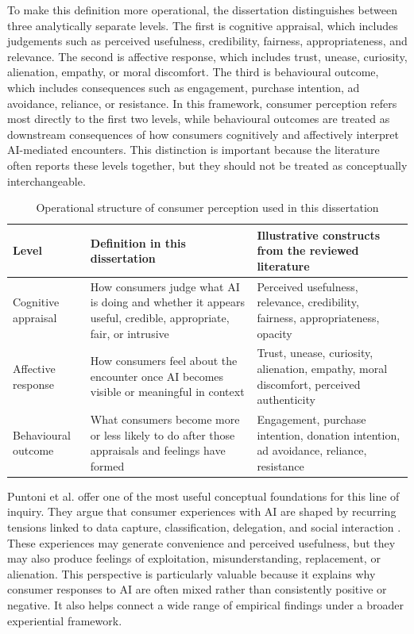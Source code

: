To make this definition more operational, the dissertation distinguishes between three analytically separate levels. The first is cognitive appraisal, which includes judgements such as perceived usefulness, credibility, fairness, appropriateness, and relevance. The second is affective response, which includes trust, unease, curiosity, alienation, empathy, or moral discomfort. The third is behavioural outcome, which includes consequences such as engagement, purchase intention, ad avoidance, reliance, or resistance. In this framework, consumer perception refers most directly to the first two levels, while behavioural outcomes are treated as downstream consequences of how consumers cognitively and affectively interpret AI-mediated encounters. This distinction is important because the literature often reports these levels together, but they should not be treated as conceptually interchangeable.

\begin{table}[ht]
\centering
\caption{Operational structure of consumer perception used in this dissertation}
\begin{tabular}{p{3.2cm} p{4.5cm} p{6.2cm}}
\toprule
Level & Definition in this dissertation & Illustrative constructs from the reviewed literature \\
\midrule
Cognitive appraisal & How consumers judge what AI is doing and whether it appears useful, credible, appropriate, fair, or intrusive & Perceived usefulness, relevance, credibility, fairness, appropriateness, opacity \\
Affective response & How consumers feel about the encounter once AI becomes visible or meaningful in context & Trust, unease, curiosity, alienation, empathy, moral discomfort, perceived authenticity \\
Behavioural outcome & What consumers become more or less likely to do after those appraisals and feelings have formed & Engagement, purchase intention, donation intention, ad avoidance, reliance, resistance \\
\bottomrule
\end{tabular}
\end{table}

Puntoni et al. offer one of the most useful conceptual foundations for this line of inquiry. They argue that consumer experiences with AI are shaped by recurring tensions linked to data capture, classification, delegation, and social interaction \cite{puntoni2021experiential}. These experiences may generate convenience and perceived usefulness, but they may also produce feelings of exploitation, misunderstanding, replacement, or alienation. This perspective is particularly valuable because it explains why consumer responses to AI are often mixed rather than consistently positive or negative. It also helps connect a wide range of empirical findings under a broader experiential framework.

